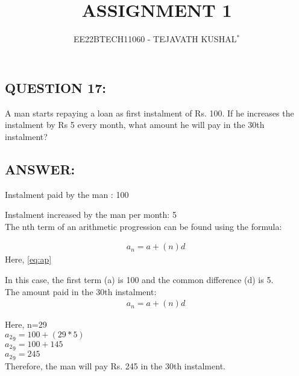 \documentclass[journal,12pt,twocolumn]{IEEEtran}
\theoremstyle{remark}
\begin{document}

\vspace{3cm}

\title{ASSIGNMENT 1}
\author{EE22BTECH11060 - TEJAVATH KUSHAL$^{*}$%
}
\maketitle
\newpage
\bigskip

\renewcommand{\thefigure}{\theenumi}
\renewcommand{\thetable}{\theenumi}


\maketitle
\subsection*{QUESTION 17:}
A man starts repaying a loan as first instalment of Rs. 100. If he increases the
instalment by Rs 5 every month, what amount he will pay in the 30th instalment?

\subsection*{ANSWER:}

Instalment paid by the man : 100

Instalment increased by the man per month: 5\\

The nth term of an arithmetic progression can be found using the formula:

 \begin{align}a_n= a+(n)d\label{eq:ap}\
 \end{align}
Here, \eqref{eq:ap}\\
\begin{center}
    \begin{table}[h]
    
   \end{table}
\end{center}
In this case, the first term (a) is 100 and the common difference (d) is 5.\\

The amount paid in the 30th instalment:\\
\begin{align*}a_n= a+(n)d\label{eq:ap}\
 \end{align*}

Here, n=29\\
${a_2}_9=100+(29*5)$\\
${a_2}_9=100+145$ \\
${a_2}_9=245$\\

Therefore, the man will pay Rs. 245 in the 30th instalment.
\end{document}
